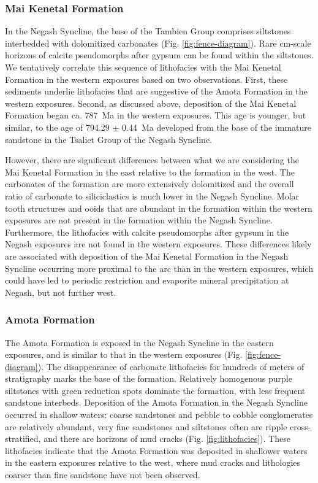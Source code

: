 \subsubsection{Mai Kenetal Formation}

In the Negash Syncline, the base of the Tambien Group comprises siltstones interbedded with dolomitized carbonates (Fig. \ref{fig:fence-diagram}). Rare cm-scale horizons of calcite pseudomorphs after gypsum can be found within the siltstones. We tentatively correlate this sequence of lithofacies with the Mai Kenetal Formation in the western exposures based on two observations. First, these sediments underlie lithofacies that are suggestive of the Amota Formation in the western exposures. Second, as discussed above, deposition of the Mai Kenetal Formation began ca. 787~Ma in the western exposures. This age is younger, but similar, to the age of 794.29 $\pm$ 0.44~Ma developed from the base of the immature sandstone in the Tsaliet Group of the Negash Syncline.

However, there are significant differences between what we are considering the Mai Kenetal Formation in the east relative to the formation in the west. The carbonates of the formation are more extensively dolomitized and the overall ratio of carbonate to siliciclastics is much lower in the Negash Syncline. Molar tooth structures and ooids that are abundant in the formation within the western exposures are not present in the formation within the Negash Syncline. Furthermore, the lithofacies with calcite pseudomorphs after gypsum in the Negash exposures are not found in the western exposures. These differences likely are associated with deposition of the Mai Kenetal Formation in the Negash Syncline occurring more proximal to the arc than in the western exposures, which could have led to periodic restriction and evaporite mineral precipitation at Negash, but not further west.

\subsubsection{Amota Formation}

The Amota Formation is exposed in the Negash Syncline in the eastern exposures, and is similar to that in the western exposures (Fig. \ref{fig:fence-diagram}). The disappearance of carbonate lithofacies for hundreds of meters of stratigraphy marks the base of the formation. Relatively homogenous purple siltstones with green reduction spots dominate the formation, with less frequent sandstone interbeds. Deposition of the Amota Formation in the Negash Syncline occurred in shallow waters: coarse sandstones and pebble to cobble conglomerates are relatively abundant, very fine sandstones and siltstones often are ripple cross-stratified, and there are horizons of mud cracks (Fig. \ref{fig:lithofacies}). These lithofacies indicate that the Amota Formation was deposited in shallower waters in the eastern exposures relative to the west, where mud cracks and lithologies coarser than fine sandstone have not been observed.

